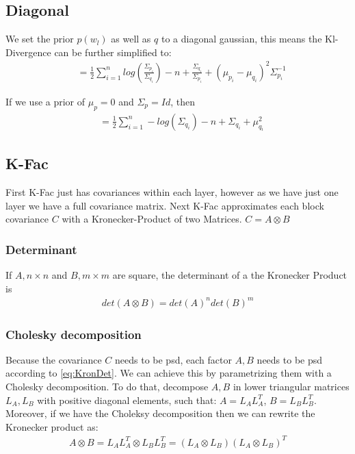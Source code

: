 \documentclass[a4paper]{scrartcl}
\begin{document}
  \subsection{Diagonal}
      We set the prior $p(w_l)$ as well as $q$ to a diagonal gaussian, this
      means the Kl-Divergence can be further simplified to:
      \begin{align}
          &= \frac{1}{2} \sum_{i=1}^n log(\frac{ \Sigma_{p_i}}{\Sigma_{q_i}}) - n + \frac{\Sigma_{q_i}}{\Sigma_{p_i}}  +  (\mu_{p_i} - \mu_{q_i})^2 \Sigma^{-1}_{p_i}
      \end{align}

      If we use a prior of $\mu_p=0$ and $\Sigma_p=Id$, then
      \begin{align}
          &= \frac{1}{2} \sum_{i=1}^n - log(\Sigma_{q_i}) - n + \Sigma_{q_i} +  \mu_{q_i}^2
      \end{align}
          

  \subsection{K-Fac}
      First K-Fac just has covariances within each layer, however as we have
      just one layer we have a full covariance matrix.
      Next K-Fac approximates each block covariance $C$ with a Kronecker-Product of two Matrices.
      $C= A \otimes B$

      \subsubsection{Determinant}
        If $A, n\times n$ and $B, m \times m$ are square, the determinant of a the Kronecker Product is
        \begin{align}\label{eq:KronDet}
          det(A \otimes B) = det(A)^n det(B)^m
        \end{align}
        
      \subsubsection{Cholesky decomposition}
        Because the covariance $C$ needs to be psd, each factor $A,B$ needs to be
        psd according to \ref{eq:KronDet}. We can achieve this by parametrizing them with a Cholesky
        decomposition. To do that, decompose $A,B$ in lower triangular matrices
        $L_A, L_B$ with positive diagonal elements, such that: $A=L_AL_A^T$,
        $B=L_BL_B^T$.
        Moreover, if we have the Choleksy decomposition then we can rewrite the Kronecker product as:
        \begin{align}\label{eq:CholKron}
          A \otimes B = L_AL_A^T \otimes L_BL_B^T = (L_A \otimes L_B) (L_A \otimes L_B)^T
        \end{align}
        
\end{document}
